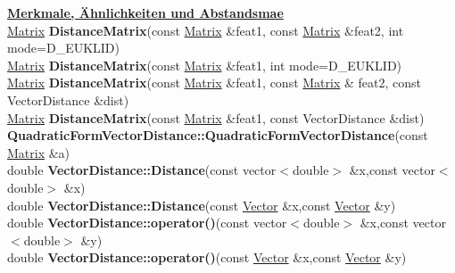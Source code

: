 \documentclass[10pt,titlepage]{article}
\newcommand{\subtitle}[1]{{\noindent\bf#1}}
\def\functionlistentry#1#2#3#4#5#6{\noindent #1 {\bf #2}(#3) \dotfill #6\\}
\begin{document}
{{\subtitle{\hyperlink{SECTION:features}{Merkmale, \"Ahnlichkeiten und Abstandsma\IeC {\ss }e}}\\
\functionlistentry{\hyperlink{Matrix}{Matrix}}{DistanceMatrix}{const \hyperlink{Matrix}{Matrix} \&feat1, const \hyperlink{Matrix}{Matrix} \&feat2, int mode=D\_EUKLID}{1239}{features}{}
\functionlistentry{\hyperlink{Matrix}{Matrix}}{DistanceMatrix}{const \hyperlink{Matrix}{Matrix} \&feat1, int mode=D\_EUKLID}{1240}{features}{}
\functionlistentry{\hyperlink{Matrix}{Matrix}}{DistanceMatrix}{const \hyperlink{Matrix}{Matrix} \&feat1, const \hyperlink{Matrix}{Matrix} \& feat2, const VectorDistance \&dist}{1241}{features}{}
\functionlistentry{\hyperlink{Matrix}{Matrix}}{DistanceMatrix}{const \hyperlink{Matrix}{Matrix} \&feat1, const VectorDistance \&dist}{1242}{features}{}
\functionlistentry{}{QuadraticFormVectorDistance::QuadraticFormVectorDistance}{const \hyperlink{Matrix}{Matrix} \&a}{1238}{features}{}
\functionlistentry{double}{VectorDistance::Distance}{const vector$<$double$>$ \&x,const vector$<$double$>$ \&x}{1234}{features}{}
\functionlistentry{double}{VectorDistance::Distance}{const \hyperlink{Vector}{Vector} \&x,const \hyperlink{Vector}{Vector} \&y}{1235}{features}{}
\functionlistentry{double}{VectorDistance::operator()}{const vector$<$double$>$ \&x,const vector$<$double$>$ \&y}{1236}{features}{}
\functionlistentry{double}{VectorDistance::operator()}{const \hyperlink{Vector}{Vector} \&x,const \hyperlink{Vector}{Vector} \&y}{1237}{features}{}

}}
\end{document}
